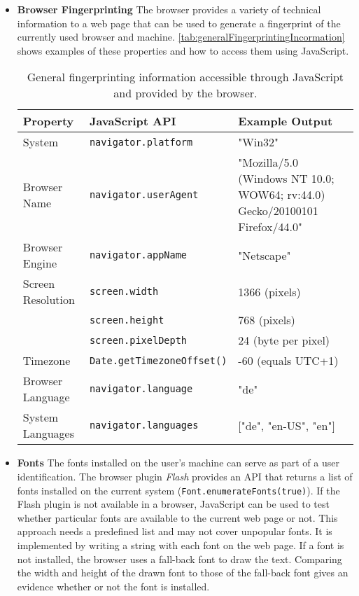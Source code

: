	\begin{itemize}
		\item \textbf{Browser Fingerprinting} The browser provides a variety of technical information to a web page that can be used to generate a fingerprint of the currently used browser and machine. \autoref{tab:generalFingerprintingIncormation} shows examples of these properties and how to access them using JavaScript. 
		
		\begin{table}
			\begin{tabular}{|l|l|p{}|} \hline
				\textbf{Property} & \textbf{JavaScript API} & \textbf{Example Output} \\ \hline
				System & \texttt{navigator.platform} & "Win32" \\ \hline
				Browser Name & \texttt{navigator.userAgent} & "Mozilla/5.0 (Windows NT 10.0; WOW64; rv:44.0) Gecko/20100101 Firefox/44.0" \\ \hline
				Browser Engine & \texttt{navigator.appName} & "Netscape" \\ \hline
				Screen Resolution & \texttt{screen.width} & 1366 (pixels) \\
				& \texttt{screen.height} & 768 (pixels) \\
				& \texttt{screen.pixelDepth} & 24 (byte per pixel) \\ \hline
				Timezone & \texttt{Date.getTimezoneOffset()} & -60 (equals UTC+1) \\ \hline
				Browser Language & \texttt{navigator.language} & "de" \\ \hline
				System Languages & \texttt{navigator.languages} & ["de", "en-US", "en"] \\ \hline
			\end{tabular}
			\caption{General fingerprinting information accessible through JavaScript and provided by the browser.}
			\label{tab:generalFingerprintingIncormation}
		\end{table}
		
		\item \textbf{Fonts} The fonts installed on the user's machine can serve as part of a user identification. The browser plugin \textit{Flash} provides an API that returns a list of fonts installed on the current system (\texttt{Font.enumerateFonts(true)})\cite{flashPlayerGetFonts}. If the Flash plugin is not available in a browser, JavaScript can be used to test whether particular fonts are available to the current web page or not. This approach needs a predefined list and may not cover unpopular fonts. It is implemented by writing a string with each font on the web page. If a font is not installed, the browser uses a fall-back font to draw the text. Comparing the width and height of the drawn font to those of the fall-back font gives an evidence whether or not the font is installed.
		

\end{itemize}

